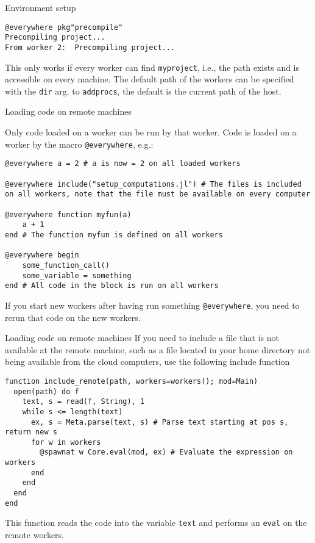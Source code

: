 \documentclass{beamer}
\begin{document}
\begin{frame}[fragile]{Environment setup}{}
\begin{verbatim}
@everywhere pkg"precompile"
Precompiling project...
From worker 2:	Precompiling project...
		\end{verbatim}
		This only works if every worker can find \texttt{myproject}, i.e., the path exists and is accessible on every machine. The default path of the workers can be specified with the \texttt{dir} arg. to \texttt{addprocs}, the default is the current path of the host.

\end{frame}



\begin{frame}[fragile]{Loading code on remote machines}{}

Only code loaded on a worker can be run by that worker. Code is loaded on a worker by the macro \verb+@everywhere+, e.g.:
\begin{verbatim}
@everywhere a = 2 # a is now = 2 on all loaded workers

@everywhere include("setup_computations.jl") # The files is included on all workers, note that the file must be available on every computer

@everywhere function myfun(a)
    a + 1
end # The function myfun is defined on all workers

@everywhere begin
    some_function_call()
    some_variable = something
end # All code in the block is run on all workers
\end{verbatim}
If you start new workers after having run something \texttt{@everywhere}, you need to rerun that code on the new workers.

\end{frame}


\begin{frame}[fragile]{Loading code on remote machines}
If you need to include a file that is not available at the remote machine, such as a file located in your home directory not being available from the cloud computers, use the following include function
\begin{verbatim}
function include_remote(path, workers=workers(); mod=Main)
  open(path) do f
    text, s = read(f, String), 1
    while s <= length(text)
      ex, s = Meta.parse(text, s) # Parse text starting at pos s, return new s
      for w in workers
        @spawnat w Core.eval(mod, ex) # Evaluate the expression on workers
      end
    end
  end
end
\end{verbatim}
This function reads the code into the variable \texttt{text} and performs an \texttt{eval} on the remote workers.
\end{frame}
\end{document}
